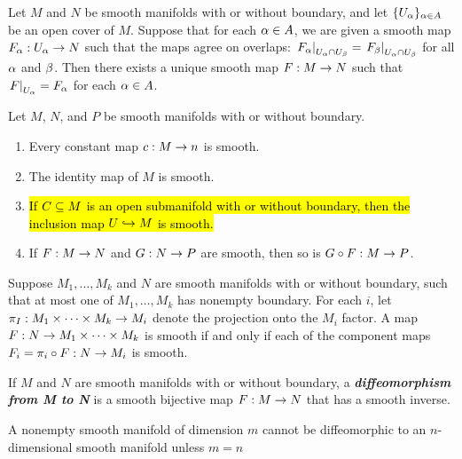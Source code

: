 \setcounter{thm}{7}

\begin{cor}
Let $M$ and $N$ be smooth manifolds with or without boundary, and let $\{U_\alpha\}_{\alpha\in A}$ be an open cover of $M$. Suppose that for each $\alpha\in A$, we are given a smooth map $F_\alpha:U_\alpha\rightarrow N$ such that the maps agree on overlaps: $\left. F_\alpha\right|_{U_\alpha\cap U_\beta} = \left. F_\beta\right|_{U_\alpha\cap U_\beta}$ for all $\alpha$ and $\beta$. Then there exists a unique smooth map $F:M\rightarrow N$ such that $\left. F\right|_{U_\alpha} = F_\alpha$ for each $\alpha\in A$.
\end{cor}

\setcounter{thm}{9}

\begin{prop}Let $M$, $N$, and $P$ be smooth manifolds with or without boundary.
\begin{enumerate}
    \item Every constant map $c:M\rightarrow n$ is smooth.
    \item The identity map of $M$ is smooth.
    \item \hl{If $C\subseteq M$ is an open submanifold with or without boundary, then the inclusion map $U\hookrightarrow M$ is smooth.}
    \item If $F:M\rightarrow N$ and $G:N\rightarrow P$ are smooth, then so is $G\circ F:M\rightarrow P$.
\end{enumerate}
\end{prop}

\setcounter{thm}{11}

\begin{prop}
Suppose $M_1,\ldots,M_k$ and $N$ are smooth manifolds with or without boundary, such that at most one of $M_1,\ldots,M_k$ has nonempty boundary. For each $i$, let $\pi_I:M_1\times \cdots\times M_k\rightarrow M_i$ denote the projection onto the $M_i$ factor. A map $F:N\rightarrow M_1\times \cdots \times M_k$ is smooth if and only if each of the component maps $F_i = \pi_i\circ F:N\rightarrow M_i$ is smooth.
\end{prop}

\dfn If $M$ and $N$ are smooth manifolds with or without boundary, a \textbf{\textit{diffeomorphism from M to N}} is a smooth bijective map $F:M\rightarrow N$ that has a smooth inverse.

\setcounter{thm}{17}

\begin{thm}
A nonempty smooth manifold of dimension $m$ cannot be diffeomorphic to an $n$-dimensional smooth manifold unless $m = n$
\end{thm}

